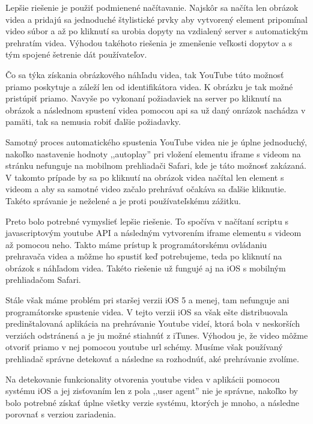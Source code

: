 Lepšie riešenie je použiť podmienené načítavanie. Najskôr sa načíta len obrázok videa a pridajú sa jednoduché štylistické prvky aby vytvorený element pripomínal video súbor a až po kliknutí sa urobia dopyty na vzdialený server s automatickým prehratím videa. Výhodou takéhoto riešenia je zmenšenie veľkosti dopytov a s tým spojené šetrenie dát používateľov. 

Čo sa týka získania obrázkového náhľadu videa, tak YouTube túto možnosť priamo poskytuje a záleží len od identifikátora videa. K obrázku je tak možné pristúpiť priamo. Navyše po vykonaní požiadaviek na server po kliknutí na obrázok a následnom spustení videa pomocou api sa už daný onrázok nachádza v pamäti, tak sa nemusia robiť ďalšie požiadavky. 

Samotný proces automatického spustenia YouTube videa nie je úplne jednoduchý, nakoľko nastavenie hodnoty ,,autoplay'' pri vložení elementu iframe s videom na stránku nefunguje na mobilnom prehliadači Safari, kde je táto možnosť zakázaná. V takomto prípade by sa po kliknutí na obrázok videa načítal len element s videom a aby sa samotné video začalo prehrávať očakáva sa ďalšie kliknutie. Takéto správanie je neželené a je proti používateľskému zážitku. 

Preto bolo potrebné vymyslieť lepšie riešenie. To spočíva v načítaní scriptu s javascriptovým youtube API a následným vytvorením iframe elementu s videom až pomocou neho. Takto máme prístup k programátorskému ovládaniu prehravača videa a môžme ho spustiť keď potrebujeme, teda po kliknutí na obrázok s náhľadom videa. Takéto riešenie už fungujé aj na iOS s mobilným prehliadačom Safari.

Stále však máme problém pri staršej verzii iOS 5 a menej, tam nefunguje ani programátorske spustenie videa. V tejto verzii iOS sa však ešte distribuovala predinštalovaná aplikácia na prehrávanie Youtube videí, ktorá bola v neskorších verziách odstránená a je ju možné stiahnúť z iTunes. Výhodou je, že video môžme otvoriť priamo v nej pomocou youtube url schémy. Musíme však používaný prehliadač správne detekovať a následne sa rozhodnúť, aké prehrávanie zvolíme.

Na detekovanie funkcionality otvorenia youtube videa v aplikácii pomocou systému iOS a jej zisťovaním len z pola ,,user agent'' nie je správne, nakoľko by bolo potrebné získať úplne všetky verzie systému, ktorých je mnoho, a následne porovnať s verziou zariadenia.

